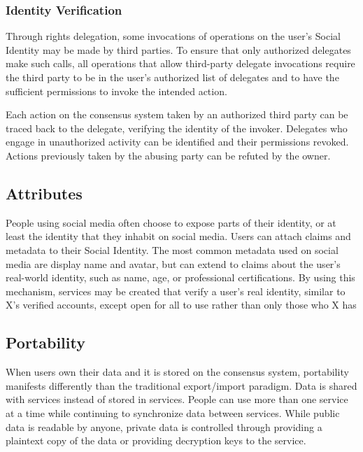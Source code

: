 \documentclass[12pt,letterpaper]{article}
\begin{document}
\subsubsection{Identity Verification}

Through rights delegation, some invocations of operations on the user's Social Identity may
be made by third parties. To ensure that only authorized delegates make such calls, all
operations that allow third-party delegate invocations require the third party to be in the
user's authorized list of delegates and to have the sufficient permissions to invoke the
intended action.

Each action on the consensus system taken by an authorized third party can be traced back to
the delegate, verifying the identity of the invoker. Delegates who engage in unauthorized
activity can be identified and their permissions revoked. Actions previously taken by the
abusing party can be refuted by the owner.

\subsection{Attributes}\label{sec:attributes}

People using social media often choose to expose parts of their identity, or at least the
identity that they inhabit on social media. Users can attach claims and metadata to their
Social Identity. The most common metadata used on social media are display name and avatar,
but can extend to claims about the user's real-world identity, such as name, age, or
professional certifications. By using this mechanism, services may be created that verify a
user's real identity, similar to X's verified accounts, except open for all to use rather
than only those who X has \cite{twitter_verified_accounts}

\subsection{Portability}\label{sec:portability}

When users own their data and it is stored on the consensus system, portability manifests
differently than the traditional export/import paradigm. Data is shared with services
instead of stored in services. People can use more than one service at a time while
continuing to synchronize data between services. While public data is readable by anyone,
private data is controlled through providing a plaintext copy of the data or providing
decryption keys to the service.
\end{document}
